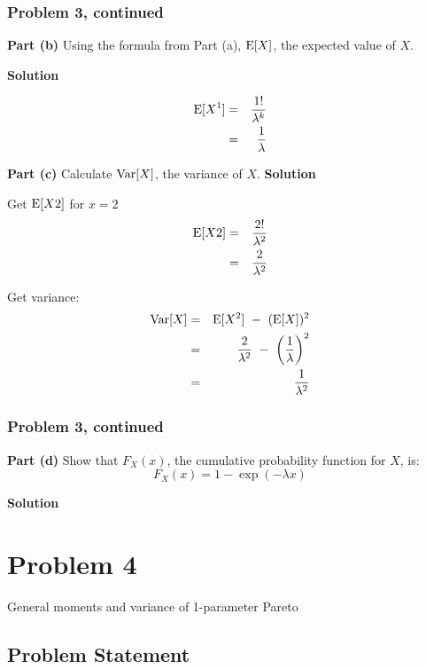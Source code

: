 \documentclass[12pt]{article}
\theoremstyle{definition}
\begin{document}
\newpage
\subsubsection*{Problem 3, continued}

{\bf Part (b)} Using the formula from Part (a), $\hbox{E}[X]$, the expected value of $X$.

\bigskip
\noindent
{\bf Solution}

\begin{eqnarray*}
\hbox{E}[X^1] & = & \frac{1!}{\lambda^k} \\
& = & \frac{1}{\lambda} \\
\end{eqnarray*}

\vspace{1in}
\noindent
{\bf Part (c)} Calculate $\hbox{Var}[X]$, the variance of $X$.
\bigskip
\noindent
{\bf Solution}

Get $\hbox{E}[X2]$ for $x=2$
\begin{eqnarray*}
\hbox{E}[X2] & = & \frac{2!}{\lambda^2} \\
& = & \frac{2}{\lambda^2}
\end{eqnarray*}

Get variance:
\begin{eqnarray*}
\hbox{Var}[X] & = & \hbox{E}[X^2] \ - \ (\hbox{E}[X])^2 \\
& = & \frac{2}{\lambda^2} \ - \ \bigg( \frac{1}{\lambda} \bigg)^2 \\
& = & \frac{1}{\lambda^2}
\end{eqnarray*}


\newpage
\subsubsection*{Problem 3, continued}

\vspace{2in}
\noindent
{\bf Part (d)} Show that $F_X(x)$, the cumulative probability function for $X$, is:
$$
F_X(x) = 1 - \exp( -\lambda x)
$$

\bigskip
\noindent
{\bf Solution}




\newpage
\section*{Problem 4}

General moments and variance of 1-parameter Pareto

\subsection*{Problem Statement}
\end{document}
